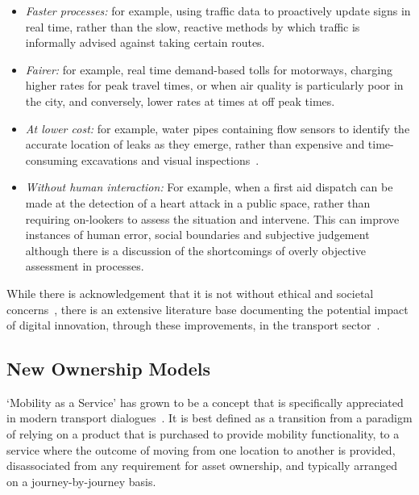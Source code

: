 \documentclass[journal]{IEEEtran}
\begin{document}
\begin{itemize}
\item {\emph{Faster processes:}} for example, using traffic data to
proactively update signs in real time, rather than the slow, reactive
methods by which traffic is informally advised against taking certain
routes.
\item {\emph{Fairer:}} for example, real time demand-based tolls for
motorways, charging higher rates for peak travel times, or when air
quality is particularly poor in the city, and conversely, lower rates
at times at off peak times.
\item {\emph{At lower cost:}} for example, water pipes containing flow
sensors to identify the accurate location of leaks as they emerge,
rather than expensive and time-consuming excavations and visual
inspections~\cite{cosgrave-et-al:2014}.
\item {\emph{Without human interaction:}} For example, when a first
aid dispatch can be made at the detection of a heart attack in a
public space, rather than requiring on-lookers to assess the situation
and intervene. This can improve instances of human error, social
boundaries and subjective judgement although there is a discussion of
the shortcomings of overly objective assessment in processes.
\end{itemize}

While there is acknowledgement that it is not without ethical and
societal concerns~\cite{bimber:1990,oatley-et-al_dasc:2015}, there is
an extensive literature base documenting the potential impact of
digital innovation, through these improvements, in the transport
sector~\cite{enoch:2015}.


\subsection{New Ownership Models}

`Mobility as a Service' has grown to be a concept that is specifically
appreciated in modern transport dialogues~\cite{tscatapult:2016}. It
is best defined as a transition from a paradigm of relying on a
product that is purchased to provide mobility functionality, to a
service where the outcome of moving from one location to another is
provided, disassociated from any requirement for asset ownership, and
typically arranged on a journey-by-journey basis.
\end{document}

